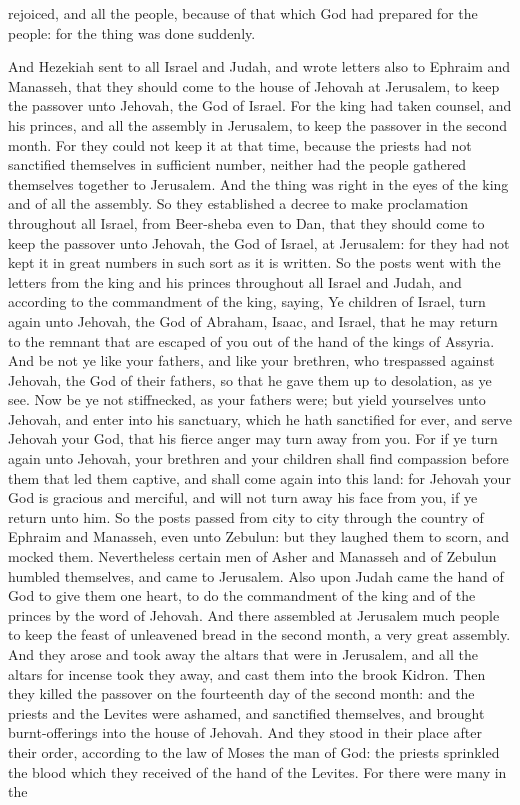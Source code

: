 rejoiced, and all the people, because of that which God had prepared for the people: for the thing was done suddenly. 

And Hezekiah sent to all Israel and Judah, and wrote letters also to Ephraim and Manasseh, that they should come to the house of Jehovah at Jerusalem, to keep the passover unto Jehovah, the God of Israel. For the king had taken counsel, and his princes, and all the assembly in Jerusalem, to keep the passover in the second month. For they could not keep it at that time, because the priests had not sanctified themselves in sufficient number, neither had the people gathered themselves together to Jerusalem. And the thing was right in the eyes of the king and of all the assembly. So they established a decree to make proclamation throughout all Israel, from Beer-sheba even to Dan, that they should come to keep the passover unto Jehovah, the God of Israel, at Jerusalem: for they had not kept it in great numbers in such sort as it is written. So the posts went with the letters from the king and his princes throughout all Israel and Judah, and according to the commandment of the king, saying, Ye children of Israel, turn again unto Jehovah, the God of Abraham, Isaac, and Israel, that he may return to the remnant that are escaped of you out of the hand of the kings of Assyria. And be not ye like your fathers, and like your brethren, who trespassed against Jehovah, the God of their fathers, so that he gave them up to desolation, as ye see. Now be ye not stiffnecked, as your fathers were; but yield yourselves unto Jehovah, and enter into his sanctuary, which he hath sanctified for ever, and serve Jehovah your God, that his fierce anger may turn away from you. For if ye turn again unto Jehovah, your brethren and your children shall find compassion before them that led them captive, and shall come again into this land: for Jehovah your God is gracious and merciful, and will not turn away his face from you, if ye return unto him.  So the posts passed from city to city through the country of Ephraim and Manasseh, even unto Zebulun: but they laughed them to scorn, and mocked them. Nevertheless certain men of Asher and Manasseh and of Zebulun humbled themselves, and came to Jerusalem. Also upon Judah came the hand of God to give them one heart, to do the commandment of the king and of the princes by the word of Jehovah.  And there assembled at Jerusalem much people to keep the feast of unleavened bread in the second month, a very great assembly. And they arose and took away the altars that were in Jerusalem, and all the altars for incense took they away, and cast them into the brook Kidron. Then they killed the passover on the fourteenth day of the second month: and the priests and the Levites were ashamed, and sanctified themselves, and brought burnt-offerings into the house of Jehovah. And they stood in their place after their order, according to the law of Moses the man of God: the priests sprinkled the blood which they received of the hand of the Levites. For there were many in the 